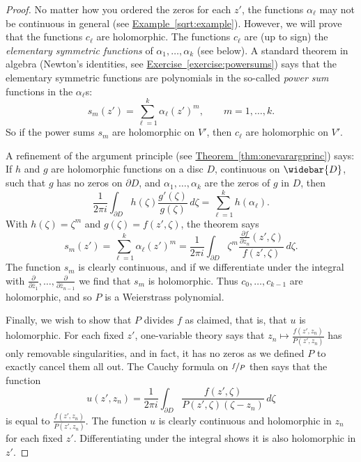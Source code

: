 \documentclass[12pt,openany]{book}
\newcommand{\myindex}[1]{#1\index{#1}}
\theoremstyle{plain}
\theoremstyle{remark}
\theoremstyle{definition}
\theoremstyle{exercise}
\theoremstyle{example}
\newcommand{\exerciseref}[1]{\hyperref[#1]{Exercise~\ref*{#1}}}
\newcommand{\exampleref}[1]{\hyperref[#1]{Example~\ref*{#1}}}
\newcommand{\thmref}[1]{\hyperref[#1]{Theorem~\ref*{#1}}}
\begin{document}
\begin{proof}
No matter how you ordered the zeros for each $z'$,
the functions $\alpha_\ell$ may not be continuous in general (see
\exampleref{sqrt:example}).  However,
we will prove that the functions $c_\ell$ are holomorphic.  The functions
$c_\ell$ are
(up to sign)
the \emph{elementary symmetric functions}
of $\alpha_1,\ldots,\alpha_k$ (see below).  A standard
theorem in algebra
(Newton's identities, see \exerciseref{exercise:powersums})
says that the elementary symmetric functions are
polynomials in the so-called \emph{\myindex{power sum}} functions
in the $\alpha_\ell$s:
\begin{equation*}
s_m(z') = \sum_{\ell=1}^k \alpha_\ell{(z')}^m , \qquad m = 1,\ldots,k.
\end{equation*}
So if the power sums $s_m$ are holomorphic on $V'$, then
$c_\ell$ are holomorphic on $V'$.

A refinement of the argument principle (see \thmref{thm:onevarargprinc}) says:
If $h$ and $g$ are
holomorphic functions on a disc $D$, continuous on $\widebar{D}$,
such that $g$ has no zeros on $\partial D$, and $\alpha_1,\ldots,\alpha_k$
are the zeros of $g$ in $D$, then
\begin{equation*}
\frac{1}{2 \pi i}
\int_{\partial D} h(\zeta) \frac{g'(\zeta)}{g(\zeta)} \, d\zeta
= \sum_{\ell=1}^k h(\alpha_\ell) .
\end{equation*}
With $h(\zeta) = \zeta^m$ and $g(\zeta)=f(z',\zeta)$, the theorem says
\begin{equation*}
s_m(z') =
\sum_{\ell=1}^k \alpha_\ell{(z')}^m
=
\frac{1}{2\pi i}
\int_{\partial D}
\zeta^m
\frac{\frac{\partial f}{\partial z_n} (z',\zeta)}{f(z',\zeta)} \,d\zeta .
\end{equation*}
The function $s_m$ is clearly continuous, and if we
differentiate under the integral
with $\frac{\partial}{\partial\bar{z}_1}, \ldots,
\frac{\partial}{\partial\bar{z}_{n-1}}$
we find that $s_m$
is holomorphic.  Thus $c_0,\ldots,c_{k-1}$ are holomorphic, and
so $P$ is a Weierstrass polynomial.

Finally, we wish to show that $P$ divides $f$ as claimed, that is,
that $u$ is holomorphic.
For each fixed $z'$, one-variable theory says that
$z_n \mapsto \frac{f(z',z_n)}{P(z',z_n)}$ has only removable singularities,
and in fact, it has no zeros as we defined $P$
to exactly cancel them all out.
The Cauchy
formula on $\nicefrac{f}{P}$ then says that the function
\begin{equation*}
u(z',z_n) =
\frac{1}{2\pi i}
\int_{\partial D} \frac{f(z',\zeta)}{P(z',\zeta)(\zeta-z_n)} \,
d\zeta
\end{equation*}
is equal to $\frac{f(z',z_n)}{P(z',z_n)}$.
The function $u$ is clearly continuous and holomorphic in $z_n$
for each fixed $z'$.
Differentiating under the integral shows it is also holomorphic in $z'$.
\end{proof}
\end{document}
